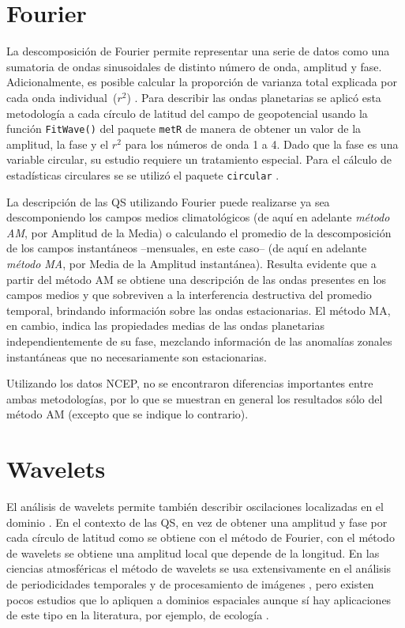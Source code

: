 \documentclass[spanish,a4paper,12pt,oneside]{book}
\begin{document}
\hypertarget{fourier}{%
\section*{Fourier}\label{fourier}}

La descomposición de Fourier permite representar una serie de datos como
una sumatoria de ondas sinusoidales de distinto número de onda, amplitud
y fase. Adicionalmente, es posible calcular la proporción de varianza
total explicada por cada onda individual~(\(r^2\)) \citep{Wilks2011}.
Para describir las ondas planetarias se aplicó esta metodología a cada
círculo de latitud del campo de geopotencial usando la función
\texttt{FitWave()} del paquete \texttt{metR} \citep{R-metR} de manera de
obtener un valor de la amplitud, la fase y el \(r^2\) para los números
de onda 1 a 4. Dado que la fase es una variable circular, su estudio
requiere un tratamiento especial. Para el cálculo de estadísticas
circulares se se utilizó el paquete \texttt{circular}
\citep{R-circular}.

La descripción de las QS utilizando Fourier puede realizarse ya sea
descomponiendo los campos medios climatológicos (de aquí en adelante
\emph{método AM}, por Amplitud de la Media) o calculando el promedio de
la descomposición de los campos instantáneos --mensuales, en este caso--
(de aquí en adelante \emph{método MA}, por Media de la Amplitud
instantánea). Resulta evidente que a partir del método AM se obtiene una
descripción de las ondas presentes en los campos medios y que sobreviven
a la interferencia destructiva del promedio temporal, brindando
información sobre las ondas estacionarias. El método MA, en cambio,
indica las propiedades medias de las ondas planetarias
independientemente de su fase, mezclando información de las anomalías
zonales instantáneas que no necesariamente son estacionarias.

Utilizando los datos NCEP, no se encontraron diferencias importantes
entre ambas metodologías, por lo que se muestran en general los
resultados sólo del método AM (excepto que se indique lo contrario).

\section*{Wavelets}

El análisis de wavelets permite también describir oscilaciones
localizadas en el dominio \citep{Torrence1998}. En el contexto de las
QS, en vez de obtener una amplitud y fase por cada círculo de latitud
como se obtiene con el método de Fourier, con el método de wavelets se
obtiene una amplitud local que depende de la longitud. En las ciencias
atmosféricas el método de wavelets se usa extensivamente en el análisis
de periodicidades temporales \citep[ej.][]{Raphael2004, Kinnard2011} y
de procesamiento de imágenes \citep[ej.][]{Desrochers1999}, pero existen
pocos estudios que lo apliquen a dominios espaciales
\citep[ej.][]{Pinault2016} aunque sí hay aplicaciones de este tipo en la
literatura, por ejemplo, de ecología \citep[ej,][]{Mi2005}.
\end{document}
